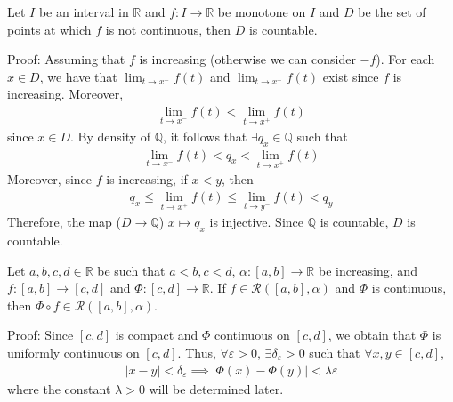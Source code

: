 \documentclass{tufte-handout}
\begin{document}
\begin{Proposition}
    Let \( I \) be an interval in \( \mathbb{R} \) and \( f: I \to \mathbb{R} \) be 
    monotone on \( I \) and \( D \) be the set of points at which 
    \( f \) is not continuous, then \( D \) is countable.
\end{Proposition}
Proof: Assuming that \( f \) is increasing (otherwise
we can consider \( -f \)). For each \( x \in D \),
we have that \( \lim_{t\to x^-}f(t) \) and \( \lim_{t\to x^+}f(t) \) exist 
since \( f \) is increasing. Moreover, 
\begin{align}
    \lim_{t\to x^-}f(t)  < \lim_{t\to x^+}f(t)
\end{align}
since \( x\in D \). By density of \( \mathbb{Q} \),
it follows that \( \exists q_x \in \mathbb{Q} \)
such that 
\begin{align}
    \lim_{t\to x^-}f(t) < q_x < \lim_{t\to x^+}f(t)
\end{align}
Moreover, since \( f \) is increasing, if \( x < y \),
then 
\begin{align}
    q_x \leq \lim_{t\to x^+}f(t) \leq \lim_{t\to y^-}f(t) < q_y
\end{align}
Therefore, the map (\( D \to \mathbb{Q} \)) \( x\mapsto q_x \) is 
injective. Since \( \mathbb{Q} \) is countable, \( D \) is countable.
\hfill\qedsymbol

\begin{Proposition}
    Let \( a,b,c,d \in \mathbb{R} \) be such that \( a<b, c<d \), 
    \( \alpha: [a,b] \to \mathbb{R} \) be increasing, and \( f: [a,b] \to [c,d] \)
    and \( \Phi: [c,d] \to \mathbb{R} \). If 
    \( f \in \mathcal{R}([a,b], \alpha) \) and \( \Phi \) is continuous, then
    \( \Phi \circ f \in \mathcal{R}([a,b], \alpha) \).
\end{Proposition}
Proof: Since \( [c,d] \) is compact and \( \Phi \)
continuous on \( [c,d] \), we obtain that 
\( \Phi \) is uniformly continuous on \( [c,d] \). 
Thus, \(\forall \varepsilon > 0\), \(\exists \delta_\varepsilon > 0\) 
such that \(\forall x,y\in [c,d]\), 
\begin{align}
    |x-y| < \delta_\varepsilon \implies |\Phi(x) - \Phi(y)| < \lambda\varepsilon
\end{align}
where the constant \( \lambda > 0 \) will be determined later.
\end{document}
